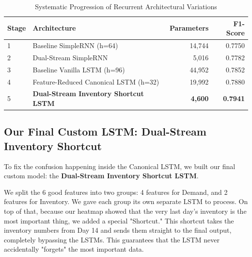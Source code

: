 \begin{table}[!htbp]
\centering
\caption{Systematic Progression of Recurrent Architectural Variations}
\label{tab:rnn_variations}
\begin{tabular}{llrr}
\toprule
\textbf{Stage} & \textbf{Architecture} & \textbf{Parameters} & \textbf{F1-Score} \\
\midrule
1 & Baseline SimpleRNN (h=64) & 14,744 & 0.7750 \\
2 & Dual-Stream SimpleRNN & 5,016 & 0.7782 \\
3 & Baseline Vanilla LSTM (h=96) & 44,952 & 0.7852 \\
4 & Feature-Reduced Canonical LSTM (h=32) & 19,992 & 0.7880 \\
5 & \textbf{Dual-Stream Inventory Shortcut LSTM} & \textbf{4,600} & \textbf{0.7941} \\
\bottomrule
\end{tabular}
\end{table}

\subsection{Our Final Custom LSTM: Dual-Stream Inventory Shortcut}

To fix the confusion happening inside the Canonical LSTM, we built our final custom model: the \textbf{Dual-Stream Inventory Shortcut LSTM}. 

We split the 6 good features into two groups: 4 features for Demand, and 2 features for Inventory. We gave each group its own separate LSTM to process. On top of that, because our heatmap showed that the very last day's inventory is the most important thing, we added a special "Shortcut." This shortcut takes the inventory numbers from Day 14 and sends them straight to the final output, completely bypassing the LSTMs. This guarantees that the LSTM never accidentally "forgets" the most important data.

